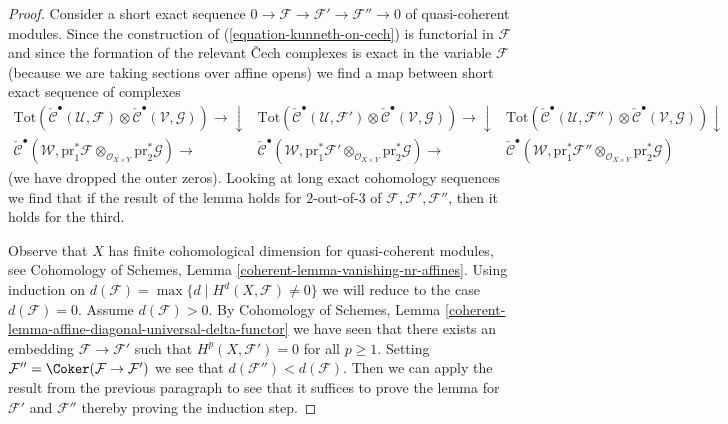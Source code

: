 \begin{proof}
\medskip\noindent
Consider a short exact
sequence $0 \to \mathcal{F} \to \mathcal{F}' \to \mathcal{F}'' \to 0$
of quasi-coherent modules. Since the construction of
(\ref{equation-kunneth-on-cech}) is functorial in $\mathcal{F}$ and since the
formation of the relevant {\v C}ech complexes is exact in
the variable $\mathcal{F}$ (because we are taking sections over
affine opens) we find a map between short exact sequence of
complexes
$$
\begin{array}{ccc}\text{Tot}(
\check{\mathcal{C}}^\bullet(\mathcal{U}, \mathcal{F})
\otimes
\check{\mathcal{C}}^\bullet(\mathcal{V}, \mathcal{G})) \longrightarrow\downarrow & \text{Tot}(
\check{\mathcal{C}}^\bullet(\mathcal{U}, \mathcal{F}')
\otimes
\check{\mathcal{C}}^\bullet(\mathcal{V}, \mathcal{G})) \longrightarrow\downarrow & \text{Tot}(
\check{\mathcal{C}}^\bullet(\mathcal{U}, \mathcal{F}'')
\otimes
\check{\mathcal{C}}^\bullet(\mathcal{V}, \mathcal{G})) \downarrow \\ \check{\mathcal{C}}^\bullet(\mathcal{W},
\text{pr}_1^*\mathcal{F} \otimes_{\mathcal{O}_{X \times Y}}
\text{pr}_2^*\mathcal{G}) \longrightarrow & \check{\mathcal{C}}^\bullet(\mathcal{W},
\text{pr}_1^*\mathcal{F}' \otimes_{\mathcal{O}_{X \times Y}}
\text{pr}_2^*\mathcal{G}) \longrightarrow & \check{\mathcal{C}}^\bullet(\mathcal{W},
\text{pr}_1^*\mathcal{F}'' \otimes_{\mathcal{O}_{X \times Y}}
\text{pr}_2^*\mathcal{G})\end{array}
$$
(we have dropped the outer zeros).
Looking at long exact cohomology sequences we find that if the result of
the lemma holds for $2$-out-of-$3$ of
$\mathcal{F}, \mathcal{F}', \mathcal{F}''$, then it holds for
the third.

\medskip\noindent
Observe that $X$ has finite cohomological dimension for
quasi-coherent modules, see Cohomology of Schemes, Lemma
\ref{coherent-lemma-vanishing-nr-affines}.
Using induction on
$d(\mathcal{F}) = \max \{d \mid H^d(X, \mathcal{F}) \not = 0\}$
we will reduce to the case $d(\mathcal{F}) = 0$.
Assume $d(\mathcal{F}) > 0$.
By Cohomology of Schemes, Lemma
\ref{coherent-lemma-affine-diagonal-universal-delta-functor}
we have seen that
there exists an embedding $\mathcal{F} \to \mathcal{F}'$
such that $H^p(X, \mathcal{F}') = 0$ for all $p \geq 1$.
Setting $\mathcal{F}'' = \Coker(\mathcal{F} \to \mathcal{F}')$
we see that $d(\mathcal{F}'') < d(\mathcal{F})$.
Then we can apply the result from the previous paragraph
to see that it suffices to prove the lemma for $\mathcal{F}'$
and $\mathcal{F}''$ thereby proving the induction step.


\end{proof}
